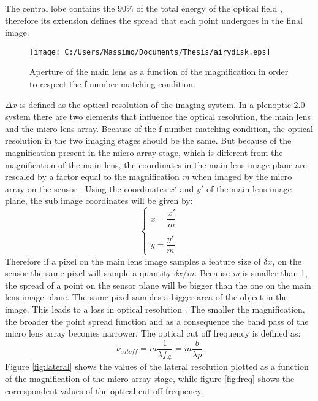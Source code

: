 The central lobe contains the $90 \%$ of the total energy of the optical field \cite{goodman2005introduction}, therefore its extension defines the spread that each point undergoes in the final image. 
\begin{figure}[H]
	\centering
	\texttt{[image: C:/Users/Massimo/Documents/Thesis/airydisk.eps]}
	\caption{\label{fig:airydisk} Aperture of the main lens as a function of the magnification in order to respect the f-number matching condition.}
\end{figure}
$\Delta x$ is defined as the optical resolution of the imaging system.
In a plenoptic 2.0 system there are two elements that influence the optical resolution, the main lens and the micro lens array. Because of the f-number matching condition, the optical resolution in the two imaging stages should be the same. But because of the magnification present in the micro array stage, which is different from the magnification of the main lens, the coordinates in the main lens image plane are rescaled by a factor equal to the magnification \textit{m} when imaged by the micro array on the sensor \cite{goodman2005introduction}. Using the coordinates $x'$ and $y'$ of the main lens image plane, the sub image coordinates will be given by:
\begin{equation}
	\label{eq:rescale}
	\begin{cases}
		x = \dfrac{x'}{m}
		\\
		\\
		y = \dfrac{y'}{m}
	\end{cases}
\end{equation}   
Therefore if a pixel on the main lens image samples a feature size of $\delta x$, on the sensor the same pixel will sample a quantity $\delta x/m$. Because \textit{m} is smaller than 1, the spread of a point on the sensor plane will be bigger than the one on the main lens image plane. The same pixel samples a bigger area of the object in the image. This leads to a loss in optical resolution \cite{turola2014wave}. The smaller the magnification, the broader the point spread function and as a consequence the band pass of the micro lens array becomes narrower.
The optical cut off frequency is defined as:
\begin{equation}
	\label{eq:cutoff1}
	\nu_{cutoff} = m\dfrac{1}{\lambda f_\#} = m\dfrac{b}{\lambda p}
\end{equation}
Figure \ref{fig:lateral} shows the values of the lateral resolution plotted as a function of the magnification of the micro array stage, while figure \ref{fig:freq} shows the correspondent values of the optical cut off frequency.
